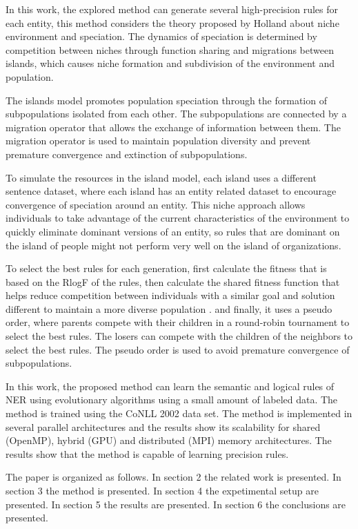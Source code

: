 \documentclass{IEEEtran}
\begin{document}
In this work, the explored method can generate several high-precision rules for each entity, this method considers the theory proposed by Holland \cite{holland-1992-adaptation} about niche environment and speciation. The dynamics of speciation is determined by competition between niches through function sharing and migrations between islands, which causes niche formation and subdivision of the environment and population.

The islands model promotes population speciation through the formation of subpopulations isolated from each other. The subpopulations are connected by a migration operator that allows the exchange of information between them\cite{holland-1992-adaptation}. The migration operator is used to maintain population diversity and prevent premature convergence and extinction of subpopulations.

To simulate the resources in the island model, each island uses a different sentence dataset, where each island has an entity related dataset to encourage convergence of speciation around an entity. This niche approach allows individuals to take advantage of the current characteristics of the environment to quickly eliminate dominant versions of an entity, so rules that are dominant on the island of people might not perform very well on the island of organizations.

To select the best rules for each generation, first calculate the fitness that is based on the RlogF \cite{seman_lex} of the rules, then calculate the shared fitness function that helps reduce competition between individuals with a similar goal and solution different to maintain a more diverse population \cite{goldber_mul}. and finally, it uses a pseudo order, where parents compete with their children in a round-robin tournament to select the best rules. The losers can compete with the children of the neighbors to select the best rules. The pseudo order is used to avoid premature convergence of subpopulations.

In this work, the proposed method can learn the semantic and logical rules of NER using evolutionary algorithms using a small amount of labeled data. The method is trained using the CoNLL 2002 \cite{tjong-kim-sang-2002-introduction} data set. The method is implemented in several parallel architectures and the results show its scalability for shared (OpenMP), hybrid (GPU) and distributed (MPI) memory architectures. The results show that the method is capable of learning precision rules.

The paper is organized as follows. In section 2 the related work is presented. In section 3 the method is presented.
In section 4 the expetimental setup are presented. In section 5 the results are presented. In section 6 the conclusions are presented.
\end{document}
